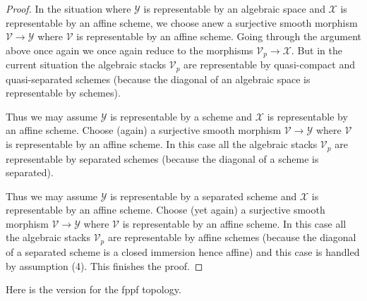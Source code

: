 \begin{proof}
\medskip\noindent
In the situation where $\mathcal{Y}$ is representable by an algebraic
space and $\mathcal{X}$ is representable by an affine scheme, we choose
anew a surjective smooth morphism $\mathcal{V} \to \mathcal{Y}$ where
$\mathcal{V}$ is representable by an affine scheme. Going through the
argument above once again we once again reduce to the morphisms
$\mathcal{V}_p \to \mathcal{X}$. But in the current situation the algebraic
stacks $\mathcal{V}_p$ are representable by quasi-compact and quasi-separated
schemes (because the diagonal of an algebraic space is representable by
schemes).

\medskip\noindent
Thus we may assume $\mathcal{Y}$ is representable by a scheme and
$\mathcal{X}$ is representable by an affine scheme. Choose (again)
a surjective smooth morphism $\mathcal{V} \to \mathcal{Y}$ where
$\mathcal{V}$ is representable by an affine scheme. In this case all
the algebraic stacks $\mathcal{V}_p$ are representable by separated
schemes (because the diagonal of a scheme is separated).

\medskip\noindent
Thus we may assume $\mathcal{Y}$ is representable by a separated scheme and
$\mathcal{X}$ is representable by an affine scheme. Choose (yet again)
a surjective smooth morphism $\mathcal{V} \to \mathcal{Y}$ where
$\mathcal{V}$ is representable by an affine scheme. In this case all
the algebraic stacks $\mathcal{V}_p$ are representable by affine schemes
(because the diagonal of a separated scheme is a closed immersion hence affine)
and this case is handled by assumption (4).
This finishes the proof.
\end{proof}

Here is the version for the fppf topology.

